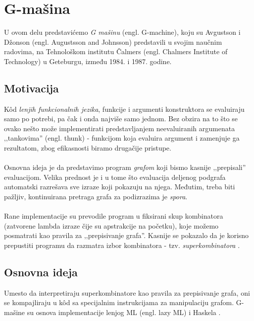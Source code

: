 \section{G-mašina}
\label{sec:Gmasine}

U ovom delu predstavićemo {\em G mašinu} (engl. G-machine), koju su Avgustson i Džonson (engl. Augustsson and Johnsson) predstavili u svojim naučnim radovima, na Tehnološkom institutu Čalmers (engl. Chalmers Institute of Technology) u Geteburgu, između 1984. i 1987. godine. 

\subsection{Motivacija}
K\^ od {\em lenjih funkcionalnih jezika}, funkcije i argumenti konstruktora se evaluiraju samo po potrebi, pa čak i onda najviše samo jednom. Bez obzira na to što se ovako nešto može implementirati predstavljanjem neevaluiranih argumenata ‚‚tankovima'' (engl. thunk) - funkcijom koja evaluira argument i zamenjuje ga rezultatom, zbog efikasnosti biramo drugačije pristupe. \\ 
\\Osnovna ideja je da predstavimo program {\em grafom} koji bismo kasnije ‚‚prepisali''  evaluacijom. Velika prednost je i u tome što evaluacija deljenog podgrafa automatski razrešava sve izraze koji pokazuju na njega. Međutim, treba biti pažljiv, kontinuirana pretraga grafa za podizrazima je {\em spora}. \\
\\
Rane implementacije su prevodile program u fiksirani skup kombinatora (zatvorene lambda izraze čije su apstrakcije na početku), koje možemo posmatrati kao pravila za ‚‚prepisivanje grafa''. Kasnije se pokazalo da je korisno prepustiti programu da razmatra izbor kombinatora - tzv. {\em superkombinatora} \cite{super-combinators}. \\ %


\subsection{Osnovna ideja} 
Umesto da interpretiraju superkombinatore kao pravila za prepisivanje grafa, oni se kompajliraju u k\^ od sa specijalnim instrukcijama za manipulaciju grafom. G-mašine su osnova implementacije lenjog ML (engl. lazy ML) \cite{lazy-ML} i Haskela \cite{hbc}.\\ 

